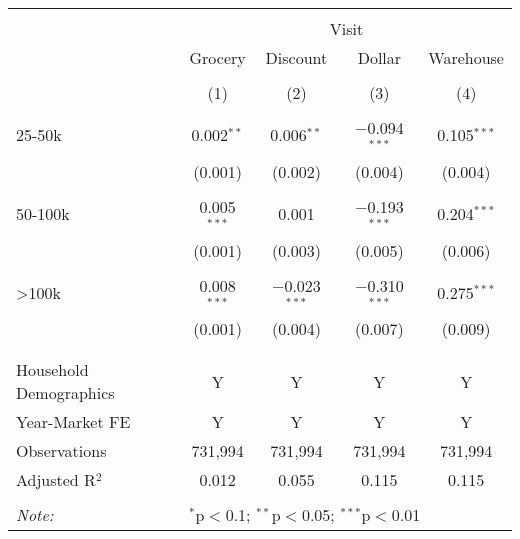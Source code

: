 
\begin{table}[!htbp] \centering 
  \caption{} 
  \label{} 
\begin{tabular}{@{\extracolsep{5pt}}lcccc} 
\\[-1.8ex]\hline 
\hline \\[-1.8ex] 
 & \multicolumn{4}{c}{Visit} \\ 
\cline{2-5} 
 & Grocery & Discount & Dollar & Warehouse \\ 
\\[-1.8ex] & (1) & (2) & (3) & (4)\\ 
\hline \\[-1.8ex] 
 25-50k & 0.002$^{**}$ & 0.006$^{**}$ & $-$0.094$^{***}$ & 0.105$^{***}$ \\ 
  & (0.001) & (0.002) & (0.004) & (0.004) \\ 
  & & & & \\ 
 50-100k & 0.005$^{***}$ & 0.001 & $-$0.193$^{***}$ & 0.204$^{***}$ \\ 
  & (0.001) & (0.003) & (0.005) & (0.006) \\ 
  & & & & \\ 
 >100k & 0.008$^{***}$ & $-$0.023$^{***}$ & $-$0.310$^{***}$ & 0.275$^{***}$ \\ 
  & (0.001) & (0.004) & (0.007) & (0.009) \\ 
  & & & & \\ 
\hline \\[-1.8ex] 
Household Demographics & Y & Y & Y & Y \\ 
Year-Market FE & Y & Y & Y & Y \\ 
Observations & 731,994 & 731,994 & 731,994 & 731,994 \\ 
Adjusted R$^{2}$ & 0.012 & 0.055 & 0.115 & 0.115 \\ 
\hline 
\hline \\[-1.8ex] 
\textit{Note:}  & \multicolumn{4}{l}{$^{*}$p$<$0.1; $^{**}$p$<$0.05; $^{***}$p$<$0.01} \\ 
\end{tabular} 
\end{table} 
